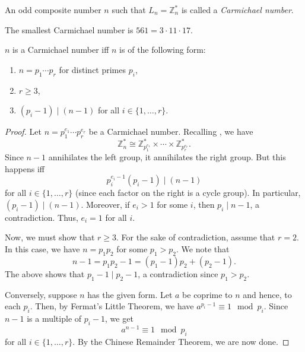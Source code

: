 \documentclass[12pt]{article}
\begin{document}
    \begin{defn}
        An odd composite number $n$ such that $L_{n} = \mathbb{Z}_{n}^{\ast}$ is called a \emph{Carmichael number}.
    \end{defn}
    
    \begin{ex}
        The smallest Carmichael number is $561 = 3 \cdot 11 \cdot 17.$
    \end{ex}
     
    \begin{thm}
        $n$ is a Carmichael number iff $n$ is of the following form:
        \begin{enumerate}
            \item $n = p_{1} \cdots p_{r}$ for distinct primes $p_{i}$,
            \item $r \ge 3$,
            \item $(p_{i} - 1) \mid (n - 1)$ for all $i \in \{1, \ldots, r\}$. 
        \end{enumerate}
    \end{thm}
    \begin{proof} 
        Let $n = p_{1}^{e_{1}} \cdots p_{r}^{e_{r}}$ be a Carmichael number. Recalling , we have
        \begin{equation*} 
            \mathbb{Z}_{n}^{\ast} \cong \mathbb{Z}_{p_{1}^{e_1}}^{\ast} \times \cdots \times \mathbb{Z}_{p_{r}^{e_{r}}}^{\ast}.
        \end{equation*}
        Since $n - 1$ annihilates the left group, it annihilates the right group. But this happens iff 
        \begin{equation*} 
            p_{i}^{e_{i} - 1}(p_{i} - 1) \mid (n - 1)
        \end{equation*} 
        for all $i \in \{1, \ldots, r\}$ (since each factor on the right is a cycle group). In particular, $(p_{i} - 1) \mid (n - 1)$. Moreover, if $e_{i} > 1$ for some $i$, then $p_{i} \mid n - 1$, a contradiction. Thus, $e_{i} = 1$ for all $i$.

        Now, we must show that $r \ge 3$. For the sake of contradiction, assume that $r = 2$. In this case, we have $n = p_{1} p_{2}$ for some $p_{1} > p_{2}$. We note that
        \begin{equation*} 
            n - 1 = p_{1} p_{2} - 1 = (p_{1} - 1) p_{2} + (p_{2} - 1).
        \end{equation*}
        The above shows that $p_{1} - 1 \mid p_{2} - 1$, a contradiction since $p_{1} > p_{2}$.

        Conversely, suppose $n$ has the given form. Let $a$ be coprime to $n$ and hence, to each $p_{i}$. Then, by Fermat's Little Theorem, we have $a^{p_{i} - 1} \equiv 1 \mod p_{i}$. Since $n - 1$ is a multiple of $p_{i} - 1$, we get
        \begin{equation*} 
            a^{n - 1} \equiv 1 \mod p_{i}
        \end{equation*}
        for all $i \in \{1, \ldots, r\}$. By the Chinese Remainder Theorem, we are now done.
    \end{proof}
\end{document}
